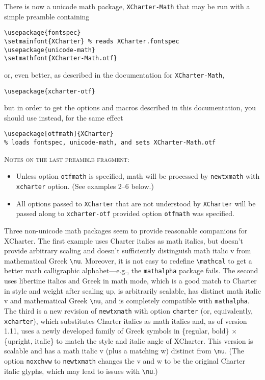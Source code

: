 \documentclass[11pt]{article}
\begin{document}
There is now a unicode math package, {\tt XCharter-Math} that may be run with a simple preamble containing
\begin{verbatim}
\usepackage{fontspec}
\setmainfont{XCharter} % reads XCharter.fontspec
\usepackage{unicode-math}
\setmathfont{XCharter-Math.otf}
\end{verbatim}
or, even better, as described in the documentation for {\tt XCharter-Math},
\begin{verbatim}
\usepackage{xcharter-otf}
\end{verbatim}
but in order to get the options and macros described in this documentation, you should use instead, for the same effect
\begin{verbatim}
\usepackage[otfmath]{XCharter} 
% loads fontspec, unicode-math, and sets XCharter-Math.otf
\end{verbatim}
\textsc{Notes on the last preamble fragment:}
\begin{itemize}
\item
Unless option {\tt otfmath} is specified,  math will be processed by {\tt newtxmath} with {\tt xcharter} option. (See examples 2--6 below.)
\item All options passed to {\tt XCharter} that are not understood by {\tt XCharter} will be passed along to {\tt xcharter-otf} provided option {\tt otfmath} was specified. 
\end{itemize}
Three non-unicode math packages seem to provide reasonable companions for \textsf{XCharter}. The first example uses Charter italics as math italics, but doesn't provide arbitrary scaling and doesn't sufficiently distinguish math italic v from mathematical Greek \verb|\nu|. Moreover, it is not easy to redefine \verb|\mathcal| to get a better math calligraphic alphabet---e.g., the {\tt mathalpha} package fails. The second uses \textsf{libertine} italics and Greek in math mode, which is a good match to Charter in style and weight after scaling up, is arbitrarily scalable, has distinct math italic v and mathematical Greek \verb|\nu|, and is completely compatible with {\tt mathalpha}. The third is a new revision of {\tt newtxmath} with option {\tt charter} (or, equivalently, {\tt xcharter}), which substitutes Charter italics as math italics and, as of version 1.11,  uses a newly developed family of Greek symbols in \{regular, bold\} $\times$ \{upright, italic\} to match the style and italic angle of XCharter. This version is scalable and has a math italic v (plus a matching w) distinct from \verb|\nu|. (The option {\tt noxchvw} to {\tt newtxmath} changes the v and w to be the original Charter italic glyphs, which may lead to issues with \verb|\nu|.)
\end{document}
